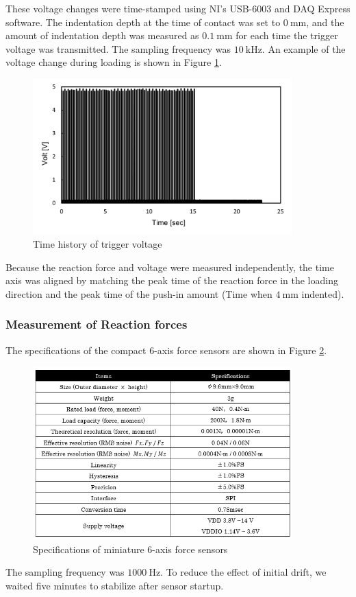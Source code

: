 These voltage changes were time-stamped using NI's USB-6003 and DAQ Express software. The indentation depth at the time of contact was set to
$\SI{0}{\milli \m}$, and the amount of indentation depth was measured as $\SI{0.1}{\milli \m}$ for each time the trigger voltage was transmitted. The sampling frequency was 
$\SI{10}{\kilo \hertz}$. An example of the voltage change during loading is shown in Figure \ref{fig:timevoltageynu}.\\
\begin{figure}%
	\centering
   \quad
   \includegraphics[width=10cm]{Images/appendix/ynu/fig4timehistoryoftriggervoltage.png}%
   \caption{Time history of trigger voltage}%
   \label{fig:timevoltageynu}%
\end{figure}
Because the reaction force and voltage were measured independently, the time axis was aligned by matching the peak time of the reaction force in the loading direction and the peak time of the push-in amount (Time when $\SI{4}{\milli \m}$ indented).

\subsubsection*{Measurement of Reaction forces}
The specifications of the compact 6-axis force sensors are shown in Figure \ref{fig:specsensorynu}. 
\begin{figure}%
	\centering
   \quad
   \includegraphics[width=10cm]{Images/appendix/ynu/tab1specificationsofminiature6axisforcesensors.png}%
   \caption{Specifications of miniature 6-axis force sensors}%
   \label{fig:specsensorynu}%
\end{figure}
The sampling frequency was $\SI{1000}{\hertz}$. To reduce the effect of initial drift, we waited five minutes to stabilize after sensor startup.

